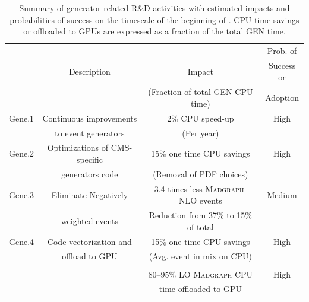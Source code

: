 \begin{table}[tbph]
    \centering
    \caption{Summary of generator-related R\&D activities with estimated impacts and probabilities of success on the timescale of the beginning of \RunFour. \gls{CPU} time savings or offloaded to \glspl{GPU} are expressed as a fraction of the total \gls{GEN} time.}
    \begin{tabular}{|c|c|c|c|}
    \hline
    \rowcolor{tableheader} 
           &                               &                            & Prob. of \\ 
    \rowcolor{tableheader}
           & Description                   &       Impact               & Success or \\  
    \rowcolor{tableheader}
           &                               &                  (Fraction of total GEN CPU time)          & Adoption   \\ \hline
    \cellcolor{tablerowheader}
  Gene.1   &  {Continuous improvements}    &  {2\% CPU speed-up}         &   High   \\
    \cellcolor{tablerowheader}
           &   {to event generators}       &      { (Per year)}         &          \\ \hline
    \cellcolor{tablerowheader}
  Gene.2   &   {Optimizations of CMS-specific} &  {15\% one time CPU savings} &   High   \\
    \cellcolor{tablerowheader}
           &   {generators code}           &   {(Removal of PDF choices)}&          \\ \hline
    \cellcolor{tablerowheader}
  Gene.3   &   {Eliminate Negatively}      &  {3.4 times less \textsc{Madgraph}-NLO events}                   &  Medium   \\
\cellcolor{tablerowheader}       &    {weighted events}                           &  Reduction from 37\% to 15\% of total &   \\ \hline
    \cellcolor{tablerowheader}
  Gene.4   &  Code vectorization and       &  {15\% one time CPU savings}  &   High  \\
    \cellcolor{tablerowheader}
           & offload to GPU                &  {(Avg. event in mix on CPU)}   &          \\ 
               \cellcolor{tablerowheader}
           &    &    &   \\
    \cellcolor{tablerowheader}
           &    &   {80--95\% LO \textsc{Madgraph} CPU }      &   {High} \\ 
    \cellcolor{tablerowheader}
           &    &   {time offloaded to GPU}      &   \\ 

\end{tabular}
\end{table}

